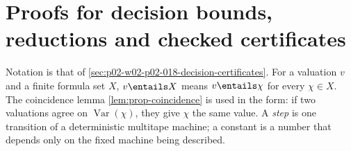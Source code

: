 \section{Proofs for decision bounds, reductions and checked certificates}
\label{sec:annex-p02-w02-p02-018-decision-certificates}

Notation is that of \cref{sec:p02-w02-p02-018-decision-certificates}.  For a
valuation \(v\) and a finite formula set \(X\), \(v\entails X\) means
\(v\entails\chi\) for every \(\chi\in X\).  The coincidence lemma
\cref{lem:prop-coincidence} is used in the form: if two valuations agree on
\(\operatorname{Var}(\chi)\), they give \(\chi\) the same value.  A
\emph{step} is one transition of a deterministic multitape machine; a constant
is a number that depends only on the fixed machine being described.

